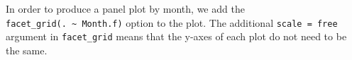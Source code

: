 In order to produce a panel plot by month, we add the
\texttt{facet\_grid(.\ \textasciitilde{}\ Month.f)} option to the plot.
The additional \texttt{scale\ =\ free} argument in \texttt{facet\_grid}
means that the y-axes of each plot do not need to be the same.

\begin{Shaded}
\begin{Highlighting}[]
\StringTok{ }\NormalTok{airquality[}\StringTok{ } \NormalTok{|}\StringTok{ }
\StringTok{      }\StringTok{ }\NormalTok{), ]}
\StringTok{ }
\StringTok{      } \NormalTok{(}\NormalTok{, }\NormalTok{))}


\end{Highlighting}
\end{Shaded}
